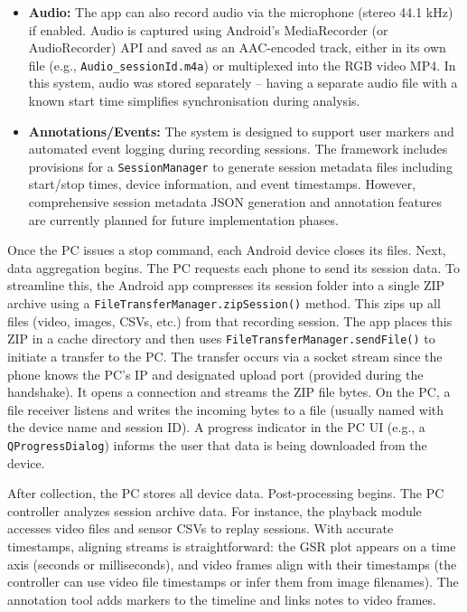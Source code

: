 \begin{itemize}
    \item \textbf{Audio:} The app can also record audio via the microphone (stereo 44.1 kHz) if enabled. Audio is captured using Android's MediaRecorder (or AudioRecorder) API and saved as an AAC-encoded track, either in its own file (e.g., \texttt{Audio\_\<sessionId\>.m4a}) or multiplexed into the RGB video MP4. In this system, audio was stored separately -- having a separate audio file with a known start time simplifies synchronisation during analysis.
    \item \textbf{Annotations/Events:} The system is designed to support user markers and automated event logging during recording sessions. The framework includes provisions for a \texttt{SessionManager} to generate session metadata files including start/stop times, device information, and event timestamps. However, comprehensive session metadata JSON generation and annotation features are currently planned for future implementation phases.
\end{itemize}

Once the PC issues a stop command, each Android device closes its files. Next, data aggregation begins. The PC requests each phone to send its session data. To streamline this, the Android app compresses its session folder into a single ZIP archive using a \texttt{FileTransferManager.zipSession()} method. This zips up all files (video, images, CSVs, etc.) from that recording session. The app places this ZIP in a cache directory and then uses \texttt{FileTransferManager.sendFile()} to initiate a transfer to the PC. The transfer occurs via a socket stream \textemdash since the phone knows the PC's IP and designated upload port (provided during the handshake). It opens a connection and streams the ZIP file bytes. On the PC, a file receiver listens and writes the incoming bytes to a file (usually named with the device name and session ID). A progress indicator in the PC UI (e.g., a \texttt{QProgressDialog}) informs the user that data is being downloaded from the device.

After collection, the PC stores all device data. Post-processing begins. The PC controller analyzes session archive data. For instance, the playback module accesses video files and sensor CSVs to replay sessions. With accurate timestamps, aligning streams is straightforward: the GSR plot appears on a time axis (seconds or milliseconds), and video frames align with their timestamps (the controller can use video file timestamps or infer them from image filenames). The annotation tool adds markers to the timeline and links notes to video frames.


